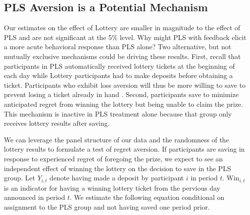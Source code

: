 \documentclass[11pt]{article}
\begin{document}




	\subsection{PLS Aversion is a Potential Mechanism}

		Our estimates on the effect of Lottery are smaller in magnitude to the effect of PLS and are not significant at the 5\% level. Why might PLS with feedback elicit a more acute behavioral response than PLS alone? Two alternative, but not mutually exclusive mechanisms could be driving these results. First, recall that participants in PLS automatically received lottery tickets at the beginning of each day while Lottery participants had to make deposits before obtaining a ticket. Participants who exhibit loss aversion will thus be more willing to save to prevent losing a ticket already in hand \parencite{kahneman_advances_1992}. Second, participants save to minimize anticipated regret from winning the lottery but being unable to claim the prize. This mechanism is inactive in PLS treatment alone because that group only receives lottery results after saving.


		We can leverage the panel structure of our data and the randomness of the lottery results to formulate a test of regret aversion. If participants are saving in response to experienced regret of foregoing the prize, we expect to see an independent effect of winning the lottery on the decision to save in the PLS group. Let $Y_{i,t}$ denote having made a deposit by participant $i$ in period $t$. $\text{Win}_{i,t}$ is an indicator for having a winning lottery ticket from the pervious day announced in period $t$. We estimate the following equation conditional on assignment to the PLS group and not having saved one period prior.
\end{document}

